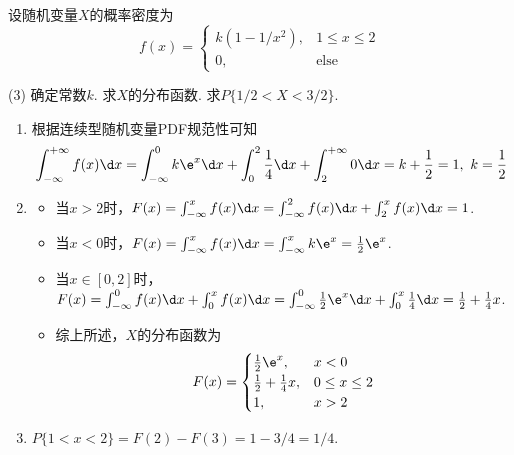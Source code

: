 \begin{problem}
    设随机变量$X$的概率密度为
    \[f(x)=\begin{cases}
        k(1-1/x^2), & 1\leq x\leq2\\
        0, & \text{else}
    \end{cases}\]
    \begin{tasks}[label=\arabic*.](3)
        \task 确定常数$k$.
        \task 求$X$的分布函数.
        \task 求$P\{1/2<X<3/2\}$.
    \end{tasks}
\end{problem}
\begin{solution}\leavevmode
    \begin{enumerate}
        \item 根据连续型随机变量PDF规范性可知
        \[\int_{-\infty}^{+\infty}f(x)\d x=\int_{-\infty}^0k\e^x\d x+\int_0^2\frac14\d x+\int_2^{+\infty}0\d x=k+\frac12=1,\ k=\frac12\]
        \item 
        \begin{itemize}
            \item 当$x>2$时，$F(x)=\int_{-\infty}^xf(x)\d x=\int_{-\infty}^2f(x)\d x+\int_2^xf(x)\d x=1$.
            \item 当$x<0$时，$F(x)=\int_{-\infty}^xf(x)\d x=\int_{-\infty}^xk\e^x=\frac12\e^x$.
            \item 当$x\in[0,2]$时，$F(x)=\int_{-\infty}^0f(x)\d x+\int_0^xf(x)\d x=\int_{-\infty}^0\frac12\e^x\d x+\int_0^x\frac14\d x=\frac12+\frac14x$.
            \item 综上所述，$X$的分布函数为
            \[F(x)=\begin{cases}
                \frac12\e^x, & x<0\\
                \frac12+\frac14x, & 0\leq x\leq2\\
                1, & x>2
            \end{cases}\]
        \end{itemize}
        \item $P\{1<x<2\}=F(2)-F(3)=1-3/4=1/4$.
    \end{enumerate}
\end{solution}

